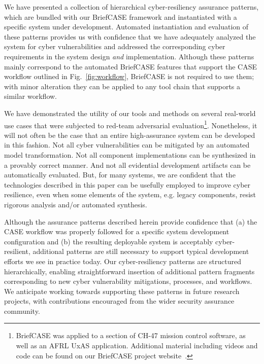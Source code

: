 
We have presented a collection of hierarchical cyber-resiliency assurance patterns, which are bundled with our BriefCASE framework and instantiated with a specific system under development.  Automated instantiation and evaluation of these patterns provides us with confidence that we have adequately analyzed the system for cyber vulnerabilities and addressed the corresponding cyber requirements in the system design \textit{and} implementation.
Although these patterns mainly correspond to the automated BriefCASE features that support the CASE workflow outlined in Fig.~\ref{fig:workflow}, BriefCASE is not required to use them; with minor alteration they can be applied to any tool chain that supports a similar workflow.

We have demonstrated the utility of our tools and methods on several real-world use cases that were subjected to red-team adversarial evaluation\footnote{BriefCASE was applied to a section of CH-47 mission control software, as well as an AFRL UxAS application. Additional material including videos and code can be found on our BriefCASE project website~\cite{BriefCASE-project}.}.  Nonetheless, it will not often be the case that an entire high-assurance system can be developed in this fashion.  Not all cyber vulnerabilities can be mitigated by an automated model transformation.  Not all component implementations can be synthesized in a provably correct manner.  And not all evidential development artifacts can be automatically evaluated.  But, for many systems, we are confident that the technologies described in this paper can be usefully employed to improve cyber resilience, even when some elements of the system, e.g. legacy components, resist rigorous analysis and/or automated synthesis.

Although the assurance patterns described herein provide confidence that (a) the CASE workflow was properly followed for a specific system development configuration and (b) the resulting deployable system is acceptably cyber-resilient, additional patterns are still necessary to support typical development efforts we see in practice today.  
%
Our cyber-resiliency patterns are structured hierarchically, enabling straightforward insertion of additional pattern fragments corresponding to new cyber vulnerability mitigations, processes, and workflows. 
We anticipate working towards supporting these patterns in future research projects, with contributions encouraged from the wider security assurance community.